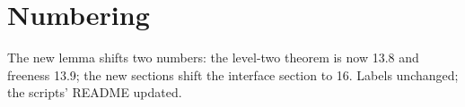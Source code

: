 \documentclass[11pt]{article}
\begin{document}
\section*{Numbering}
The new lemma shifts two numbers: the level-two theorem is now 13.8 and
freeness 13.9; the new sections shift the interface section to 16.
Labels unchanged; the scripts' README updated.
\end{document}
